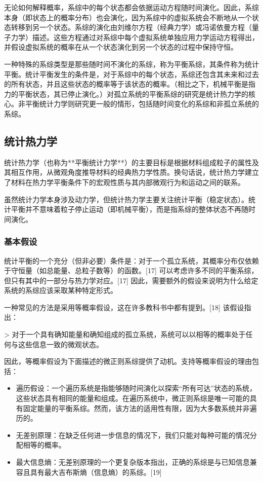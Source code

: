 无论如何解释概率，系综中的每个状态都会依据运动方程随时间演化。因此，系综本身（即状态上的概率分布）也会演化，因为系综中的虚拟系统会不断地从一个状态转移到另一个状态。系综的演化由刘维尔方程（经典力学）或冯诺依曼方程（量子力学）描述。这些方程通过对系综中每个虚拟系统单独应用力学运动方程得出，并假设虚拟系统的概率在从一个状态演化到另一个状态的过程中保持守恒。

一种特殊的系综类型是那些随时间不演化的系综，称为平衡系综，其条件称为统计平衡。统计平衡发生的条件是，对于系综中的每个状态，系综还包含其未来和过去的所有状态，并且这些状态的概率等于该状态的概率。（相比之下，机械平衡是指力的平衡状态，其已停止演化。）对孤立系统的平衡系综的研究是统计热力学的核心。非平衡统计力学则研究更一般的情形，包括随时间变化的系综和非孤立系统的系综。
\subsection{统计热力学} 
统计热力学（也称为**平衡统计力学**）的主要目标是根据材料组成粒子的属性及其相互作用，从微观角度推导材料的经典热力学性质。换句话说，统计热力学建立了材料在热力学平衡条件下的宏观性质与其内部微观行为和运动之间的联系。

虽然统计力学本身涉及动力学，但统计热力学主要关注统计平衡（稳定状态）。统计平衡并不意味着粒子停止运动（即机械平衡），而是指系综的整体状态不再随时间演化。
\subsubsection{基本假设} 
统计平衡的一个充分（但非必要）条件是：对于一个孤立系统，其概率分布仅依赖于守恒量（如总能量、总粒子数等）的函数。[17] 可以考虑许多不同的平衡系综，但只有其中的一部分与热力学对应。[17] 因此，需要额外的假设来说明为什么给定系统的系综应该采取某种特定形式。

一种常见的方法是采用等概率假设，这在许多教科书中都有提到。[18] 该假设指出：

> 对于一个具有确知能量和确知组成的孤立系统，系统可以以相等的概率处于任何与这些信息一致的微观状态。

因此，等概率假设为下面描述的微正则系综提供了动机。支持等概率假设的理由包括：

\begin{itemize}
\item 遍历假设：一个遍历系统是指能够随时间演化以探索“所有可达”状态的系统，这些状态具有相同的能量和组成。在遍历系统中，微正则系综是唯一可能的具有固定能量的平衡系综。然而，该方法的适用性有限，因为大多数系统并非遍历的。
\item 无差别原理：在缺乏任何进一步信息的情况下，我们只能对每种可能的情况分配相等的概率。
\item 最大信息熵：无差别原理的一个更复杂版本指出，正确的系综是与已知信息兼容且具有最大吉布斯熵（信息熵）的系综。[19] 
\end{itemize}